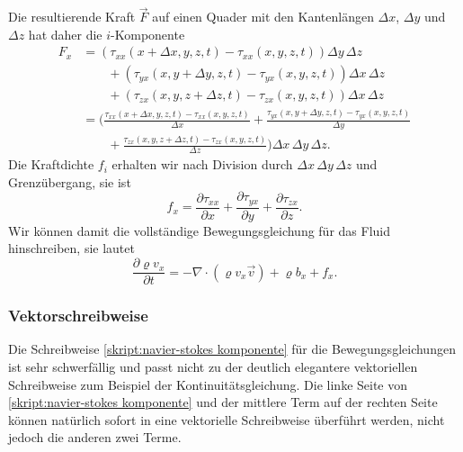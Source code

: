 Die resultierende Kraft $\vec{F}$ auf einen Quader mit den Kantenlängen
$\Delta x$, $\Delta y$ und $\Delta z$  hat daher die $i$-Komponente
\begin{align*}
F_x
&=
(
\tau_{xx}(x+\Delta x,y,z,t)
-
\tau_{xx}(x,y,z,t)
) \Delta y\,\Delta z
\\
&\qquad
+
(
\tau_{yx}(x,y+\Delta y,z,t)
-
\tau_{yx}(x,y,z,t)
) \Delta x\,\Delta z
\\
&\qquad
+
(
\tau_{zx}(x,y,z+\Delta z,t)
-
\tau_{zx}(x,y,z,t)
)\Delta x\,\Delta z
\\
&=
\bigg(
\frac{
\tau_{xx}(x+\Delta x,y,z,t)
-
\tau_{xx}(x,y,z,t)
}{\Delta x}
+
\frac{
\tau_{yx}(x,y+\Delta y,z,t)
-
\tau_{yx}(x,y,z,t)
}{\Delta y}
\\
&\qquad
+
\frac{
\tau_{zx}(x,y,z+\Delta z,t)
-
\tau_{zx}(x,y,z,t)
}{\Delta z}
\bigg)
\Delta x\,\Delta y\,\Delta z.
\end{align*}
Die Kraftdichte $f_i$ erhalten wir nach Division durch
$\Delta x\,\Delta y\,\Delta z$ und Grenzübergang, sie ist
\begin{equation}
f_x
=
\frac{\partial \tau_{xx}}{\partial x}
+
\frac{\partial \tau_{yx}}{\partial y}
+
\frac{\partial \tau_{zx}}{\partial z}.
\label{skript:spannungskraftdichte}
\end{equation}
Wir können damit die vollständige Bewegungsgleichung für das Fluid
hinschreiben, sie lautet
\begin{equation}
\frac{\partial \varrho v_x}{\partial t}
=
-\nabla\cdot (\varrho v_x\vec{v})
+
\varrho b_x
+
f_x.
\label{skript:navier-stokes komponente}
\end{equation}
\subsubsection{Vektorschreibweise}
Die Schreibweise
\eqref{skript:navier-stokes komponente}
für die Bewegungsgleichungen ist sehr schwerfällig und passt nicht
zu der deutlich elegantere vektoriellen Schreibweise zum Beispiel
der Kontinuitätsgleichung.
Die linke Seite von
\eqref{skript:navier-stokes komponente}
und der mittlere Term auf der rechten Seite können natürlich sofort
in eine vektorielle Schreibweise überführt werden, nicht jedoch die
anderen zwei Terme.

